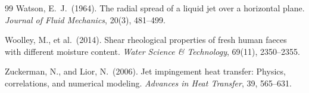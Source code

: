 \documentclass[aps,prfluids,reprint,amsmath,amssymb,floatfix]{revtex4-2}
\begin{document}
\begin{thebibliography}{99}
Watson, E.~J.\ (1964).
The radial spread of a liquid jet over a horizontal plane.
\textit{Journal of Fluid Mechanics}, 20(3), 481--499.

Woolley, M., et al.\ (2014).
Shear rheological properties of fresh human faeces with different moisture
content.
\textit{Water Science \& Technology}, 69(11), 2350--2355.

Zuckerman, N., and Lior, N.\ (2006).
Jet impingement heat transfer: Physics, correlations, and numerical
modeling.
\textit{Advances in Heat Transfer}, 39, 565--631.

\end{thebibliography}
\end{document}
